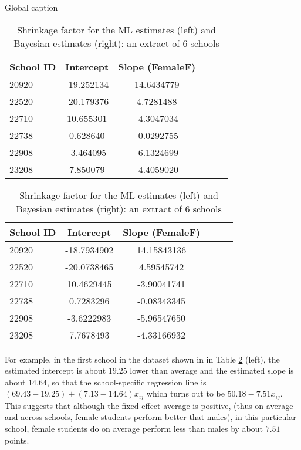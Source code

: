\begin{table}[!htb]
	\caption{Global caption}
	
	\begin{minipage}{.5\linewidth}
		\caption{}
		\centering
			{
			\begin{tabular}{l | c c c c c}
				School ID & Intercept & Slope (FemaleF)\\
				\hline
				20920 & -19.252134 & 14.6434779 \\
				22520 & -20.179376 & 4.7281488 \\
				22710 & 10.655301 & -4.3047034 \\
				22738  & 0.628640 & -0.0292755 \\
				22908 & -3.464095 & -6.1324699 \\
				23208 & 7.850079 & -4.4059020
			\end{tabular}
		}
	\end{minipage}%
	\begin{minipage}{.5\linewidth}
		\centering
		\caption{}
		{
			\begin{tabular}{l | c c c c c}
				School ID & Intercept & Slope (FemaleF)\\
				\hline
				20920 & -18.7934902 & 14.15843136 \\
				22520 & -20.0738465  & 4.59545742 \\
				22710  & 10.4629445 & -3.90041741 \\
				22738  & 0.7283296 & -0.08343345  \\
				22908 & -3.6222983 & -5.96547650 \\
				23208  & 7.7678493 & -4.33166932
			\end{tabular}
		}
		
	\end{minipage} 
	\caption{{\small Shrinkage factor for the ML estimates (left) and Bayesian estimates (right): an extract of 6 schools}}
	\label{tab:shrinkage}
\end{table}

For example, in the first school in the dataset shown in in Table \ref{tab:shrinkage} (left), the estimated intercept is about $19.25$ lower than average and the estimated slope is about $14.64$, so that the school-specific regression line is $(69.43 - 19.25) + (7.13 - 14.64) x_{ij}$ which turns out to be $ 50.18 - 7.51  x_{ij}$. This suggests that although the fixed effect average is positive, (thus on average and across schools, female students perform better that males), in this particular school, female students do on average perform less than males by about $7.51$ points.

